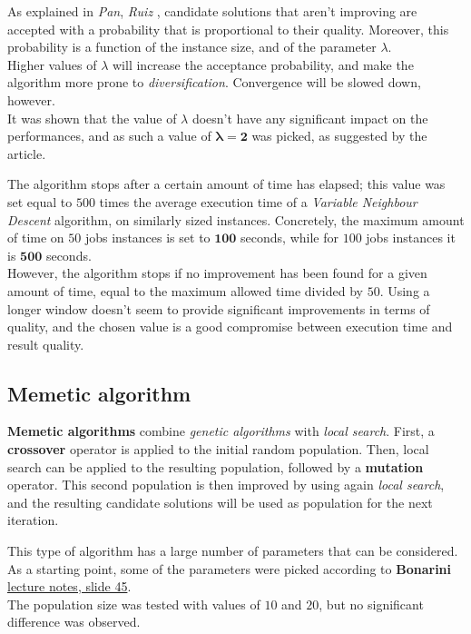 \documentclass[
12pt,
a4paper,
oneside,
headinclude,
footinclude]{article}
\theoremstyle{definition} %
\begin{document}
As explained in \textit{Pan}, \textit{Ruiz} \cite{pan2012local}, candidate solutions that aren't improving are accepted with a probability that is proportional to their quality. Moreover, this probability is a function of the instance size, and of the parameter $\lambda$.\\
Higher values of $\lambda$ will increase the acceptance probability, and make the algorithm more prone to \textit{diversification}. Convergence will be slowed down, however. \\
It was shown that the value of $\lambda$ doesn't have any significant impact on the performances, and as such a value of $\boldsymbol{\lambda = 2}$ was picked, as suggested by the article.

The algorithm stops after a certain amount of time has elapsed; this value was set equal to $500$ times the average execution time of a \textit{Variable Neighbour Descent} algorithm, on similarly sized instances. Concretely, the maximum amount of time on $50$ jobs instances is set to $\boldsymbol{100}$ seconds, while for $100$ jobs instances it is $\boldsymbol{500}$ seconds. \\
However, the algorithm stops if no improvement has been found for a given amount of time, equal to the maximum allowed time divided by $50$.
Using a longer window doesn't seem to provide significant improvements in terms of quality, and the chosen value is a good compromise between execution time and result quality.

\subsection{Memetic algorithm}
\textbf{Memetic algorithms} combine \textit{genetic algorithms} with \textit{local search}. First, a \textbf{crossover} operator is applied to the initial random population.
Then, local search can be applied to the resulting population, followed by a \textbf{mutation} operator. This second population is then improved by using again \textit{local search}, and the resulting candidate solutions will be used as population for the next iteration.

This type of algorithm has a large number of parameters that can be considered. As a starting point, some of the parameters were picked according to \textbf{Bonarini} \href{http://chrome.ws.dei.polimi.it/images/e/eb/GeneticAlgorithms.pdf}{lecture notes, slide 45}.\\
The population size was tested with values of $10$ and $20$, but no significant difference was observed.
\end{document}
